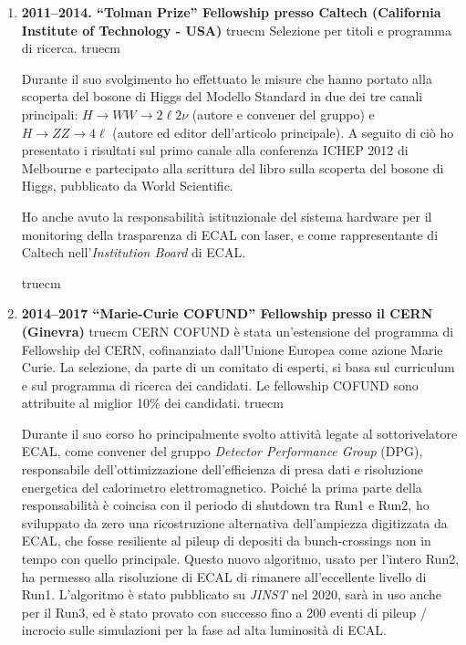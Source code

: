 \documentclass[11pt,twoside,a4paper]{article}
\begin{document}
\begin{enumerate}
Nel corso del suo svolgimento ho svolto l'analisi sui primi dati di
collisione di CMS, che ha prodotto la pubblicazione della sezione
d'urto di produzione inclusiva di bosoni W e Z e differenziale nel
numero di jet associati.

Inoltre ho svolto l'analisi dei dati per la ricerca del bosone di
Higgs H$\to$WW nei canali puramente leptonici: i risultati hanno
portato alla prima esclusione di intervalli di massa intorno a
$m_H\approx$160 GeV con i dati di LHC e le prime evidenze di eccessi
intorno a 125 GeV. Sono stato autore pricincipale dell'articolo,
nonch\'e sono stato convener del gruppo di analisi (``Livello 3'' del
gruppo di fisica dell'Higgs).


 truecm
\item \textbf{2011--2014. ``Tolman Prize'' Fellowship  presso Caltech (California Institute of Technology - USA)}
 truecm
Selezione per titoli e programma di ricerca.
 truecm

Durante il suo svolgimento ho effettuato le misure che hanno portato
alla scoperta del bosone di Higgs del Modello Standard in due dei tre
canali principali: $H \to WW\to 2\ell 2\nu$ (autore e convener del
gruppo) e $H\to ZZ \to 4\ell$ (autore ed editor dell'articolo
principale). A seguito di ci\`o ho presentato i risultati sul primo
canale alla conferenza ICHEP 2012 di Melbourne e partecipato alla
scrittura del libro sulla scoperta del bosone di Higgs, pubblicato da
World Scientific.

Ho anche avuto la responsabilit\`a istituzionale del sistema hardware
per il monitoring della trasparenza di ECAL con laser, e come
rappresentante di Caltech nell'\textit{Institution Board} di ECAL.


 truecm
\item \textbf{2014--2017 ``Marie-Curie COFUND'' Fellowship presso il CERN (Ginevra)}
 truecm
CERN COFUND \`e stata un'estensione del programma di
Fellowship del CERN, cofinanziato dall'Unione Europea come azione
Marie Curie. La selezione, da parte di un comitato di esperti, si basa
sul curriculum e sul programma di ricerca dei candidati. Le fellowship
COFUND sono attribuite al miglior 10\% dei candidati.
 truecm

Durante il suo corso ho principalmente svolto attivit\`a legate al
sottorivelatore ECAL, come convener del gruppo \textit{Detector
  Performance Group} (DPG), responsabile dell'ottimizzazione
dell'efficienza di presa dati e risoluzione energetica del calorimetro
elettromagnetico. Poich\'e la prima parte della responsabilit\`a \`e
coincisa con il periodo di shutdown tra Run1 e Run2, ho sviluppato da
zero una ricostruzione alternativa dell'ampiezza digitizzata da ECAL,
che fosse resiliente al pileup di depositi da bunch-crossings non in
tempo con quello principale. Questo nuovo algoritmo, usato per
l'intero Run2, ha permesso alla risoluzione di ECAL di rimanere
all'eccellente livello di Run1. L'algoritmo \`e stato pubblicato su
\textit{JINST} nel 2020, sar\`a in uso anche per il Run3, ed \`e stato provato
con successo fino a 200 eventi di pileup / incrocio sulle simulazioni
per la fase ad alta luminosit\`a di ECAL.


\end{enumerate}
\end{document}
